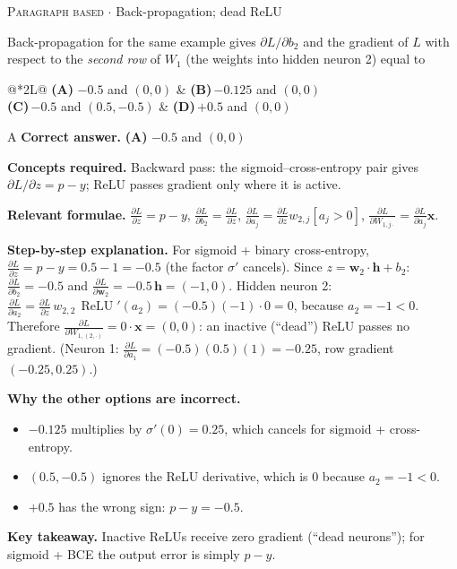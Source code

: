 \documentclass[11pt,a4paper]{article}
\newcommand{\optlabel}[1]{\textbf{(#1)}}
\newcommand{\correctlabel}[1]{\textcolor{okgreen}{\textbf{(#1)}\,\ding{51}}}
\newenvironment{qitem}[1]{\begin{list}{}{\setlength{\leftmargin}{3.3em}\setlength{\labelwidth}{3.1em}%
  \setlength{\labelsep}{0.2em}\setlength{\topsep}{3pt}\setlength{\parsep}{3pt}}\item[\textbf{Q.#1}\hfill]}{\end{list}}
\newcommand{\qsep}{\par\vspace{2pt}{\color{black!15}\hrule}\vspace{4pt}}
\newcommand{\qmeta}[2]{{\footnotesize\color{black!60}\textsc{#1} \;$\cdot$\; #2}\par}
\begin{document}
\begin{qitem}{20}
\qmeta{Paragraph based}{Back-propagation; dead ReLU}
Back-propagation for the same example gives $\partial L/\partial b_2$ and the gradient of $L$ with respect to
the \emph{second row} of $W_1$ (the weights into hidden neuron 2) equal to
\par\smallskip\noindent\begin{tabularx}{\linewidth}{@{}*{2}{L}@{}}
\correctlabel{A}\,$-0.5$ and $(0, 0)$ & \optlabel{B}\,$-0.125$ and $(0, 0)$ \\[3pt]
\optlabel{C}\,$-0.5$ and $(0.5, -0.5)$ & \optlabel{D}\,$+0.5$ and $(0, 0)$
\end{tabularx}
\end{qitem}
\begin{solbox}{A}
\textbf{\color{brand}Correct answer.} \textcolor{okgreen}{\textbf{(A)}} $-0.5$ and $(0, 0)$

\textbf{\color{brand}Concepts required.} Backward pass: the sigmoid--cross-entropy pair gives $\partial L/\partial z = p - y$; ReLU passes gradient only where it is active.

\textbf{\color{brand}Relevant formulae.} $\frac{\partial L}{\partial z} = p - y$, $\frac{\partial L}{\partial b_2} = \frac{\partial L}{\partial z}$, $\frac{\partial L}{\partial a_j} = \frac{\partial L}{\partial z}w_{2,j}[a_j > 0]$, $\frac{\partial L}{\partial W_{1,j\cdot}} = \frac{\partial L}{\partial a_j}\mathbf x$.

\textbf{\color{brand}Step-by-step explanation.} For sigmoid + binary cross-entropy, $\frac{\partial L}{\partial z} = p - y = 0.5 - 1 = -0.5$ (the factor $\sigma'$
cancels). Since $z = \mathbf w_2\cdot\mathbf h + b_2$: $\frac{\partial L}{\partial b_2} = -0.5$ and $\frac{\partial L}{\partial\mathbf w_2} = -0.5\,\mathbf h = (-1, 0)$.
Hidden neuron 2: $\frac{\partial L}{\partial a_2} = \frac{\partial L}{\partial z}\,w_{2,2}\,\operatorname{ReLU}'(a_2) = (-0.5)(-1)\cdot 0 = 0$,
because $a_2 = -1 < 0$. Therefore $\frac{\partial L}{\partial W_{1,(2,\cdot)}} = 0\cdot\mathbf x = (0, 0)$: an inactive (``dead'')
ReLU passes no gradient. (Neuron 1: $\frac{\partial L}{\partial a_1} = (-0.5)(0.5)(1) = -0.25$, row gradient $(-0.25, 0.25)$.)

\textbf{\color{brand}Why the other options are incorrect.}
\begin{itemize}[leftmargin=2.4em, itemsep=1pt, topsep=2pt]
\item[\textbf{(B)}] $-0.125$ multiplies by $\sigma'(0) = 0.25$, which cancels for sigmoid + cross-entropy.
\item[\textbf{(C)}] $(0.5, -0.5)$ ignores the ReLU derivative, which is 0 because $a_2 = -1 < 0$.
\item[\textbf{(D)}] $+0.5$ has the wrong sign: $p - y = -0.5$.
\end{itemize}
\textbf{\color{brand}Key takeaway.} Inactive ReLUs receive zero gradient (``dead neurons''); for sigmoid + BCE the output error is simply $p - y$.
\end{solbox}
\qsep
\end{document}
